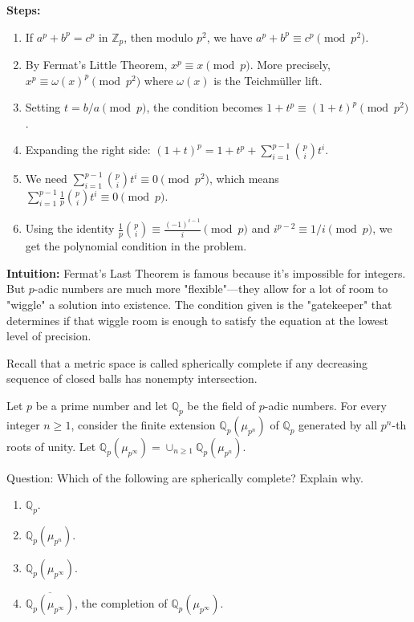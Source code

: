 \begin{solution}
\textbf{Steps:}
\begin{enumerate}
    \item If $a^p + b^p = c^p$ in $\mathbb{Z}_p$, then modulo $p^2$, we have $a^p + b^p \equiv c^p \pmod{p^2}$.
    \item By Fermat's Little Theorem, $x^p \equiv x \pmod p$. More precisely, $x^p \equiv \omega(x)^p \pmod{p^2}$ where $\omega(x)$ is the Teichmüller lift.
    \item Setting $t = b/a \pmod p$, the condition becomes $1 + t^p \equiv (1+t)^p \pmod{p^2}$.
    \item Expanding the right side: $(1+t)^p = 1 + t^p + \sum_{i=1}^{p-1} \binom{p}{i} t^i$.
    \item We need $\sum_{i=1}^{p-1} \binom{p}{i} t^i \equiv 0 \pmod{p^2}$, which means $\sum_{i=1}^{p-1} \frac{1}{p}\binom{p}{i} t^i \equiv 0 \pmod p$.
    \item Using the identity $\frac{1}{p}\binom{p}{i} \equiv \frac{(-1)^{i-1}}{i} \pmod p$ and $i^{p-2} \equiv 1/i \pmod p$, we get the polynomial condition in the problem.
\end{enumerate}

\textbf{Intuition:}
Fermat's Last Theorem is famous because it's impossible for integers. But $p$-adic numbers are much more "flexible"—they allow for a lot of room to "wiggle" a solution into existence. The condition given is the "gatekeeper" that determines if that wiggle room is enough to satisfy the equation at the lowest level of precision.
\end{solution}

\begin{exercise}
\label{algebra:2020:6}
Recall that a metric space is called spherically complete if any decreasing sequence of closed balls has nonempty intersection.

Let $p$ be a prime number and let $\mathbb{Q}_p$ be the field of $p$-adic numbers. For every integer $n \geq 1$, consider the finite extension $\mathbb{Q}_p(\mu_{p^n})$ of $\mathbb{Q}_p$ generated by all $p^n$-th roots of unity. Let $\mathbb{Q}_p(\mu_{p^\infty}) = \cup_{n \geq 1} \mathbb{Q}_p(\mu_{p^n})$.

Question: Which of the following are spherically complete? Explain why.

\begin{enumerate}
\item $\mathbb{Q}_p$.

\item $\mathbb{Q}_p(\mu_{p^n})$.

\item $\mathbb{Q}_p(\mu_{p^\infty})$.

\item $\overline{\mathbb{Q}_p(\mu_{p^\infty})}$, the completion of $\mathbb{Q}_p(\mu_{p^\infty})$.
\end{enumerate}
\end{exercise}

